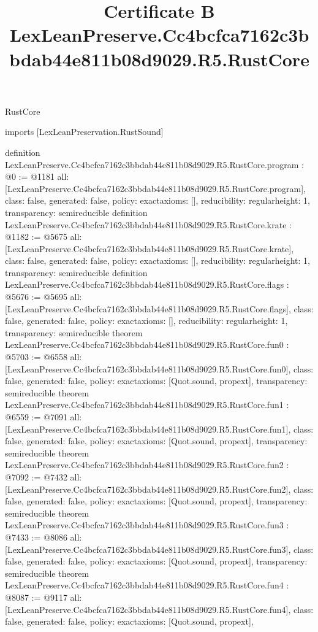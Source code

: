 \begin{lexlean}{RustCore}
\title{Certificate B LexLeanPreserve.Cc4bcfca7162c3bbdab44e811b08d9029.R5.RustCore}
\begin{coremodule}
imports [LexLeanPreservation.RustSound]

definition LexLeanPreserve.Cc4bcfca7162c3bbdab44e811b08d9029.R5.RustCore.program : @0 := @1181 {
  all: [LexLeanPreserve.Cc4bcfca7162c3bbdab44e811b08d9029.R5.RustCore.program],
  class: false,
  generated: false,
  policy: exact{axioms: []},
  reducibility: regular{height: 1},
  transparency: semireducible
}
definition LexLeanPreserve.Cc4bcfca7162c3bbdab44e811b08d9029.R5.RustCore.krate : @1182 := @5675 {
  all: [LexLeanPreserve.Cc4bcfca7162c3bbdab44e811b08d9029.R5.RustCore.krate],
  class: false,
  generated: false,
  policy: exact{axioms: []},
  reducibility: regular{height: 1},
  transparency: semireducible
}
definition LexLeanPreserve.Cc4bcfca7162c3bbdab44e811b08d9029.R5.RustCore.flags : @5676 := @5695 {
  all: [LexLeanPreserve.Cc4bcfca7162c3bbdab44e811b08d9029.R5.RustCore.flags],
  class: false,
  generated: false,
  policy: exact{axioms: []},
  reducibility: regular{height: 1},
  transparency: semireducible
}
theorem LexLeanPreserve.Cc4bcfca7162c3bbdab44e811b08d9029.R5.RustCore.fun0 : @5703 := @6558 {
  all: [LexLeanPreserve.Cc4bcfca7162c3bbdab44e811b08d9029.R5.RustCore.fun0],
  class: false,
  generated: false,
  policy: exact{axioms: [Quot.sound, propext]},
  transparency: semireducible
}
theorem LexLeanPreserve.Cc4bcfca7162c3bbdab44e811b08d9029.R5.RustCore.fun1 : @6559 := @7091 {
  all: [LexLeanPreserve.Cc4bcfca7162c3bbdab44e811b08d9029.R5.RustCore.fun1],
  class: false,
  generated: false,
  policy: exact{axioms: [Quot.sound, propext]},
  transparency: semireducible
}
theorem LexLeanPreserve.Cc4bcfca7162c3bbdab44e811b08d9029.R5.RustCore.fun2 : @7092 := @7432 {
  all: [LexLeanPreserve.Cc4bcfca7162c3bbdab44e811b08d9029.R5.RustCore.fun2],
  class: false,
  generated: false,
  policy: exact{axioms: [Quot.sound, propext]},
  transparency: semireducible
}
theorem LexLeanPreserve.Cc4bcfca7162c3bbdab44e811b08d9029.R5.RustCore.fun3 : @7433 := @8086 {
  all: [LexLeanPreserve.Cc4bcfca7162c3bbdab44e811b08d9029.R5.RustCore.fun3],
  class: false,
  generated: false,
  policy: exact{axioms: [Quot.sound, propext]},
  transparency: semireducible
}
theorem LexLeanPreserve.Cc4bcfca7162c3bbdab44e811b08d9029.R5.RustCore.fun4 : @8087 := @9117 {
  all: [LexLeanPreserve.Cc4bcfca7162c3bbdab44e811b08d9029.R5.RustCore.fun4],
  class: false,
  generated: false,
  policy: exact{axioms: [Quot.sound, propext]},
}
\end{coremodule}
\end{lexlean}
